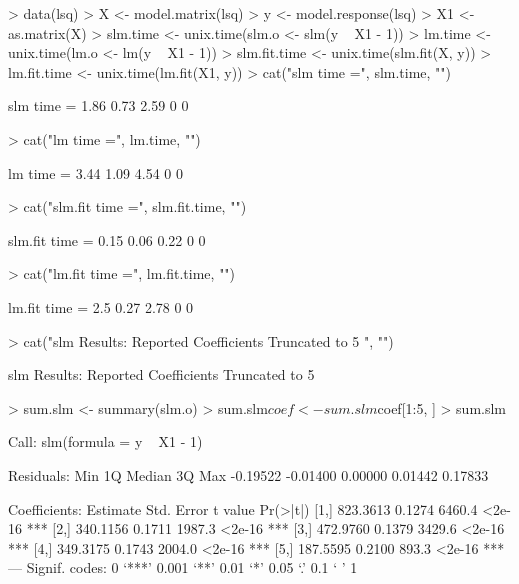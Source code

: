 \documentclass{article}
\begin{document}
\begin{Schunk}
\begin{Sinput}
> data(lsq)
> X <- model.matrix(lsq)
> y <- model.response(lsq)
> X1 <- as.matrix(X)
> slm.time <- unix.time(slm.o <- slm(y ~ X1 - 1))
> lm.time <- unix.time(lm.o <- lm(y ~ X1 - 1))
> slm.fit.time <- unix.time(slm.fit(X, y))
> lm.fit.time <- unix.time(lm.fit(X1, y))
> cat("slm time =", slm.time, "\n")
\end{Sinput}
\begin{Soutput}
slm time = 1.86 0.73 2.59 0 0 
\end{Soutput}
\begin{Sinput}
> cat("lm time =", lm.time, "\n")
\end{Sinput}
\begin{Soutput}
lm time = 3.44 1.09 4.54 0 0 
\end{Soutput}
\begin{Sinput}
> cat("slm.fit time =", slm.fit.time, "\n")
\end{Sinput}
\begin{Soutput}
slm.fit time = 0.15 0.06 0.22 0 0 
\end{Soutput}
\begin{Sinput}
> cat("lm.fit time =", lm.fit.time, "\n")
\end{Sinput}
\begin{Soutput}
lm.fit time = 2.5 0.27 2.78 0 0 
\end{Soutput}
\begin{Sinput}
> cat("slm Results: Reported Coefficients Truncated to 5  ", "\n")
\end{Sinput}
\begin{Soutput}
slm Results: Reported Coefficients Truncated to 5   
\end{Soutput}
\begin{Sinput}
> sum.slm <- summary(slm.o)
> sum.slm$coef <- sum.slm$coef[1:5, ]
> sum.slm
\end{Sinput}
\begin{Soutput}
Call:
slm(formula = y ~ X1 - 1)

Residuals:
     Min       1Q   Median       3Q      Max 
-0.19522 -0.01400  0.00000  0.01442  0.17833 

Coefficients:
     Estimate Std. Error t value Pr(>|t|)    
[1,] 823.3613     0.1274  6460.4   <2e-16 ***
[2,] 340.1156     0.1711  1987.3   <2e-16 ***
[3,] 472.9760     0.1379  3429.6   <2e-16 ***
[4,] 349.3175     0.1743  2004.0   <2e-16 ***
[5,] 187.5595     0.2100   893.3   <2e-16 ***
---
Signif. codes:  0 `***' 0.001 `**' 0.01 `*' 0.05 `.' 0.1 ` ' 1 


\end{Soutput}
\end{Schunk}
\end{document}
